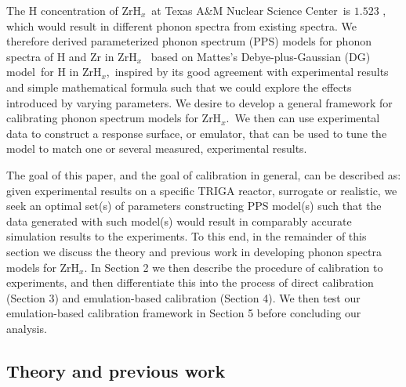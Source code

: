 \documentclass[review]{elsarticle}
\newcommand{\zh}{ZrH$_x$}
\begin{document}
The H concentration of \zh~at Texas A\&M Nuclear Science Center~is $1.523$ \cite{triga}, which would result in different phonon spectra from existing spectra. We therefore derived parameterized phonon spectrum (PPS) models for phonon spectra of H and Zr in \zh~ based on Mattes's Debye-plus-Gaussian (DG) model\cite{IKE}\ for H in \zh,~inspired by its good agreement with experimental results and simple mathematical formula such that we could explore the effects introduced by varying parameters\cite{weixiong,thesis,physor}. {We desire to  develop a general framework for calibrating phonon spectrum models for \zh.\ We then can use experimental data to construct a response surface, or emulator, that can be used to tune the model to match one or several measured, experimental results.}

The goal of this paper, and the goal of calibration in general,  can be described as: given experimental results on a specific TRIGA reactor, surrogate or realistic, we seek an optimal set(s) of parameters constructing PPS model(s) such that the data generated with such model(s) would result in comparably accurate simulation results to the experiments. To this end, in the remainder of this section we discuss the theory and previous work in developing phonon spectra models for \zh.  In Section 2 we then describe the procedure of calibration to experiments, and then differentiate this into the process of direct calibration (Section 3) and emulation-based calibration (Section 4). We then test our emulation-based calibration framework in Section 5 before concluding our analysis.
\subsection{Theory and previous work}
\end{document}
